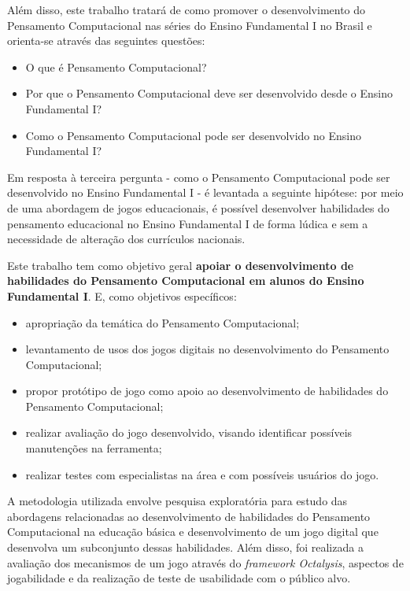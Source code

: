 Além disso, este trabalho tratará de como promover o desenvolvimento do Pensamento Computacional nas séries do Ensino Fundamental I no Brasil e orienta-se através das seguintes questões: 

\begin{itemize}
\item O que é Pensamento Computacional?
\item Por que o Pensamento Computacional deve ser desenvolvido desde o Ensino Fundamental I?
\item Como o Pensamento Computacional pode ser desenvolvido no Ensino Fundamental I?
\end{itemize}

Em resposta à terceira pergunta - como o Pensamento Computacional pode ser desenvolvido no Ensino Fundamental I - é levantada a seguinte hipótese: por meio de uma abordagem de jogos educacionais, é possível desenvolver habilidades do pensamento educacional no Ensino Fundamental I de forma lúdica e sem a necessidade de alteração dos currículos nacionais.

Este trabalho tem como objetivo geral \textbf{apoiar o desenvolvimento de habilidades do Pensamento Computacional em alunos do Ensino Fundamental I}. E, como objetivos específicos:

\begin{itemize}
	\item apropriação da temática do Pensamento Computacional;
	\item levantamento de usos dos jogos digitais no desenvolvimento do Pensamento Computacional;
	\item propor protótipo de jogo como apoio ao desenvolvimento de habilidades do Pensamento Computacional;
	\item realizar avaliação do jogo desenvolvido, visando identificar possíveis manutenções na ferramenta;
	\item realizar testes com especialistas na área e com possíveis usuários do jogo.
\end{itemize}

A metodologia utilizada envolve pesquisa exploratória para estudo das abordagens relacionadas ao desenvolvimento de habilidades do Pensamento Computacional na educação básica e desenvolvimento de um jogo digital que desenvolva um subconjunto dessas habilidades. Além disso, foi realizada a avaliação dos mecanismos de um jogo através do \textit{framework Octalysis}, aspectos de jogabilidade e da realização de teste de usabilidade com o público alvo.

